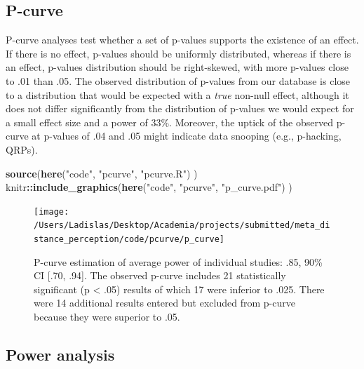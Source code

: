 \documentclass[floatsintext,doc]{apa6}
\newenvironment{Shaded}{\begin{snugshade}}{\end{snugshade}}
\newcommand{\KeywordTok}[1]{\textcolor[rgb]{0.13,0.29,0.53}{\textbf{#1}}}
\newcommand{\NormalTok}[1]{#1}
\newcommand{\OperatorTok}[1]{\textcolor[rgb]{0.81,0.36,0.00}{\textbf{#1}}}
\newcommand{\StringTok}[1]{\textcolor[rgb]{0.31,0.60,0.02}{#1}}
\begin{document}
\hypertarget{p-curve}{%
\subsection{P-curve}\label{p-curve}}

P-curve analyses test whether a set of p-values supports the existence of an effect. If there is no effect, p-values should be uniformly distributed, whereas if there is an effect, p-values distribution should be right-skewed, with more p-values close to .01 than .05. The observed distribution of p-values from our database is close to a distribution that would be expected with a \emph{true} non-null effect, although it does not differ significantly from the distribution of p-values we would expect for a small effect size and a power of 33\%. Moreover, the uptick of the observed p-curve at p-values of .04 and .05 might indicate data snooping (e.g., p-hacking, QRPs).

\begin{Shaded}
\begin{Highlighting}[]
\KeywordTok{source}\NormalTok{(}\KeywordTok{here}\NormalTok{(}\StringTok{"code"}\NormalTok{, }\StringTok{"pcurve"}\NormalTok{, }\StringTok{"pcurve.R"}\NormalTok{) )}
\NormalTok{knitr}\OperatorTok{::}\KeywordTok{include_graphics}\NormalTok{(}\KeywordTok{here}\NormalTok{(}\StringTok{"code"}\NormalTok{, }\StringTok{"pcurve"}\NormalTok{, }\StringTok{"p_curve.pdf"}\NormalTok{) )}
\end{Highlighting}
\end{Shaded}

\begin{figure}[H]

{\centering \texttt{[image: /Users/Ladislas/Desktop/Academia/projects/submitted/meta\_distance\_perception/code/pcurve/p\_curve]} 

}

\caption{P-curve estimation of average power of individual studies: .85, 90\% CI [.70, .94]. The observed p-curve includes 21 statistically significant (p < .05) results of which 17 were inferior to .025. There were 14 additional results entered but excluded from p-curve because they were superior to .05.}\label{fig:pcurve}
\end{figure}

\newpage

\hypertarget{power-analysis}{%
\subsection{Power analysis}\label{power-analysis}}
\end{document}
